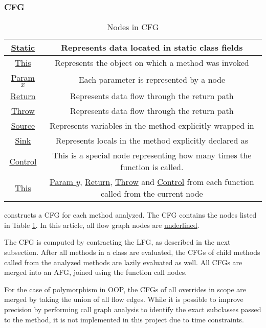 \subsubsection{\acf{CFG}}
\begin{table}
	\caption{Nodes in \ac{CFG}}
	\centering
	\begin{tabular}{|c|c|}
		\hline
		\underline{Static} & Represents data located in static class fields \\ \hline
		\underline{This} & Represents the object on which a method was invoked \\ \hline
		\underline{Param} $x$ & Each parameter is represented by a node \\ \hline
		\underline{Return} & Represents data flow through the return path \\ \hline
		\underline{Throw} & Represents data flow through the return path \\ \hline
		\underline{Source} & Represents variables in the method explicitly wrapped in \code{sourceMarker} \\ \hline
		\underline{Sink} & Represents locals in the method explicitly declared as \code{sinkMarker} \\ \hline
		\underline{Control} & This is a special node representing how many times the function is called. \\ \hline
		\underline{This} & \underline{Param $y$}, \underline{Return}, \underline{Throw} and \underline{Control}
		from each function called from the current node \\ \hline
	\end{tabular}
	\label{tab:cfg-nodes}
\end{table}

\pname{} constructs a \ac{CFG} for each method analyzed.
The \ac{CFG} contains the nodes listed in Table \ref{tab:cfg-nodes}.
In this article, all flow graph nodes are \underline{underlined}.

The CFG is computed by contracting the \ac{LFG},
as described in the next subsection.
After all methods in a class are evaluated,
the CFGs of child methods called from the analyzed methods
are lazily evaluated as well.
All CFGs are merged into an \ac{AFG},
joined using the function call nodes.

For the case of polymorphism in \ac{OOP},
the CFGs of all overrides in scope are merged by taking the union of all flow edges.
While it is possible to improve precision by performing call graph analysis
to identify the exact subclasses passed to the method,
it is not implemented in this project due to time constraints.

